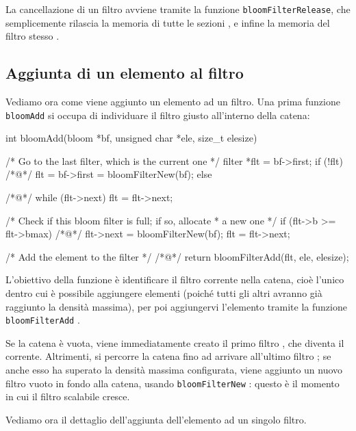 La cancellazione di un filtro avviene tramite la funzione \verb|bloomFilterRelease|, che
semplicemente rilascia la memoria di tutte le sezioni , e infine la memoria del filtro
stesso .

\subsection{Aggiunta di un elemento al filtro}

Vediamo ora come viene aggiunto un elemento ad un filtro. Una prima funzione \verb|bloomAdd| si
occupa di individuare il filtro giusto all'interno della catena:

\begin{commentedsource}[style=csource,caption=Aggiunta elemento ad un filtro scalabile]
int bloomAdd(bloom *bf, unsigned char *ele, size_t elesize) {
    /* Go to the last filter, which is the current one */
    filter *flt = bf->first;
    if (!flt)
/*@\lnote@*/        flt = bf->first = bloomFilterNew(bf);
    else {
/*@\lnote@*/        while (flt->next)
            flt = flt->next;

        /* Check if this bloom filter is full; if so, allocate
         * a new one */
        if (flt->b >= flt->bmax) {
/*@\lnote@*/            flt->next = bloomFilterNew(bf);
            flt = flt->next;
        }
    }

    /* Add the element to the filter */
/*@\lnote@*/    return bloomFilterAdd(flt, ele, elesize);
}
\end{commentedsource}

L'obiettivo della funzione è identificare il filtro corrente nella catena, cioè l'unico dentro cui è
possibile aggiungere elementi (poiché tutti gli altri avranno già raggiunto la densità massima), per
poi aggiungervi l'elemento tramite la funzione \verb|bloomFilterAdd| .

Se la catena è vuota, viene immediatamente creato il primo filtro , che diventa il
corrente. Altrimenti, si percorre la catena fino ad arrivare all'ultimo filtro ; se anche
esso ha superato la densità massima configurata, viene aggiunto un nuovo filtro vuoto in fondo alla
catena, usando \verb|bloomFilterNew| : questo è il momento in cui il filtro scalabile
cresce.

Vediamo ora il dettaglio dell'aggiunta dell'elemento ad un singolo filtro.

